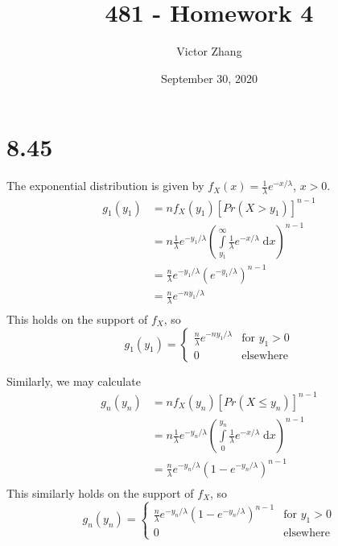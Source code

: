 \documentclass{article}
\title{481 - Homework 4}
\author{Victor Zhang}
\date{September 30, 2020}
\begin{document}
\maketitle

\section*{8.45}
The exponential distribution is given by $f_X(x) = \frac{1}{\lambda} e^{-x/\lambda}$, $x > 0$.
\begin{equation*}
\begin{split}
  g_1(y_1) &= nf_X(y_1) \left[Pr(X > y_1)\right]^{n-1}\\
  &= n\frac{1}{\lambda} e^{-y_1/\lambda} \left(\int\limits_{y_1}^\infty \frac{1}{\lambda}e^{-x/\lambda} \;\mathrm{d}x \right)^{n-1}\\
  &= \frac{n}{\lambda} e^{-y_1/\lambda} \left(e^{-y_1/\lambda}\right)^{n-1}\\
  &= \frac{n}{\lambda} e^{-ny_1/\lambda}\\
\end{split}
\end{equation*}
This holds on the support of $f_X$, so
\begin{equation*}
g_1(y_1) =
\begin{cases}
  \frac{n}{\lambda} e^{-ny_1/\lambda} & \text{for } y_1 > 0\\
  0 & \text{elsewhere}
\end{cases}
\end{equation*}

Similarly, we may calculate
\begin{equation*}
\begin{split}
  g_n(y_n) &= nf_X(y_n) \left[Pr(X \leq y_n)\right]^{n-1}\\
  &= n\frac{1}{\lambda} e^{-y_n/\lambda} \left(\int\limits_0^{y_n} \frac{1}{\lambda}e^{-x/\lambda} \;\mathrm{d}x \right)^{n-1}\\
  &= \frac{n}{\lambda} e^{-y_n/\lambda} \left(1 - e^{-y_n/\lambda}\right)^{n-1}\\
\end{split}
\end{equation*}
This similarly holds on the support of $f_X$, so
\begin{equation*}
g_n(y_n) =
\begin{cases}
  \frac{n}{\lambda} e^{-y_n/\lambda} \left(1 - e^{-y_n/\lambda}\right)^{n-1} & \text{for } y_1 > 0\\
  0 & \text{elsewhere}
\end{cases}
\end{equation*}
\end{document}
